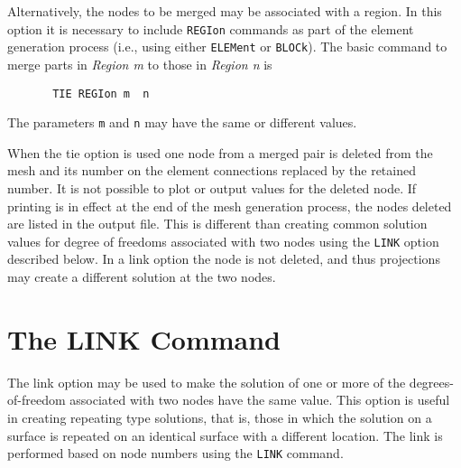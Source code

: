 Alternatively, the nodes to be merged may be associated with a region.  In
this option it is necessary to include {\tt REGIon} commands as part of the
element generation process (i.e., using either {\tt ELEMent} or {\tt BLOCk}).
The basic command to merge parts in \textit{Region m} to those in
\textit{Region n} is
\begin{verbatim}
       TIE REGIon m  n
\end{verbatim}
The parameters \texttt{m} and \texttt{n} may have the same or different values.

When the tie option is used one node from a merged pair is deleted from
the mesh and its number on the element connections replaced by the retained
number.  It is not possible to plot or output values for the
deleted node.  If printing is in effect at the end of the mesh
generation process, the nodes deleted are listed in the output
file.  This is different than creating common solution
values for degree of freedoms associated with two nodes
using the \texttt{LINK} option described below.  In a link
option the node is not deleted, and thus projections may create a
different solution at the two nodes.

\section{The LINK Command}
\label{link}

The link option may be used to make the solution of one or more of
the degrees-of-freedom associated with two nodes have the same value.
This option is useful in creating repeating type solutions, that is, those
in which the solution on a surface is repeated on an identical surface
with a different location.
The link is performed based on node numbers using the \texttt{LINK} command.
